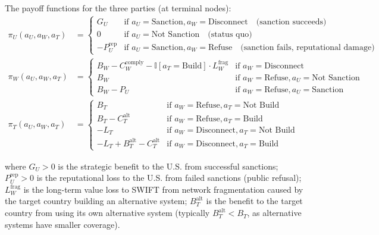 \documentclass[12pt,a4paper]{ctexart}
\theoremstyle{definition}
\theoremstyle{remark}
\begin{document}
The payoff functions for the three parties (at terminal nodes):
\begin{align}
\pi_U(a_U, a_W, a_T) &=
\begin{cases}
G_U & \text{if } a_U = \text{Sanction}, a_W = \text{Disconnect} \quad \text{(sanction succeeds)}\\
0 & \text{if } a_U = \text{Not Sanction} \quad \text{(status quo)}\\
-P_U^{\text{rep}} & \text{if } a_U = \text{Sanction}, a_W = \text{Refuse} \quad \text{(sanction fails, reputational damage)}
\end{cases}\\[6pt]
\pi_W(a_U, a_W, a_T) &=
\begin{cases}
B_W - C_W^{\text{comply}} - \mathbb{I}[a_T = \text{Build}] \cdot L_W^{\text{frag}} & \text{if } a_W = \text{Disconnect}\\
B_W & \text{if } a_W = \text{Refuse}, a_U = \text{Not Sanction}\\
B_W - P_U & \text{if } a_W = \text{Refuse}, a_U = \text{Sanction}
\end{cases}\\[6pt]
\pi_T(a_U, a_W, a_T) &=
\begin{cases}
B_T & \text{if } a_W = \text{Refuse}, a_T = \text{Not Build}\\
B_T - C_T^{\text{alt}} & \text{if } a_W = \text{Refuse}, a_T = \text{Build}\\
-L_T & \text{if } a_W = \text{Disconnect}, a_T = \text{Not Build}\\
-L_T + B_T^{\text{alt}} - C_T^{\text{alt}} & \text{if } a_W = \text{Disconnect}, a_T = \text{Build}
\end{cases}
\end{align}

where $G_U > 0$ is the strategic benefit to the U.S. from successful sanctions; $P_U^{\text{rep}} > 0$ is the reputational loss to the U.S. from failed sanctions (public refusal); $L_W^{\text{frag}}$ is the long-term value loss to SWIFT from network fragmentation caused by the target country building an alternative system; $B_T^{\text{alt}}$ is the benefit to the target country from using its own alternative system (typically $B_T^{\text{alt}} < B_T$, as alternative systems have smaller coverage).
\end{document}
